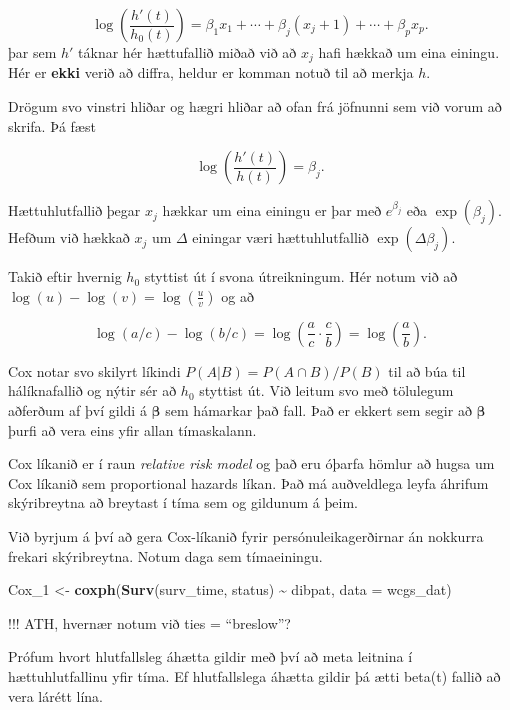 \documentclass[
]{book}
\newenvironment{Shaded}{\begin{snugshade}}{\end{snugshade}}
\newcommand{\DataTypeTok}[1]{\textcolor[rgb]{0.13,0.29,0.53}{#1}}
\newcommand{\DecValTok}[1]{\textcolor[rgb]{0.00,0.00,0.81}{#1}}
\newcommand{\KeywordTok}[1]{\textcolor[rgb]{0.13,0.29,0.53}{\textbf{#1}}}
\newcommand{\NormalTok}[1]{#1}
\newcommand{\OperatorTok}[1]{\textcolor[rgb]{0.81,0.36,0.00}{\textbf{#1}}}
\newcommand{\StringTok}[1]{\textcolor[rgb]{0.31,0.60,0.02}{#1}}
\begin{document}
\[
\log \left( \frac{h'(t)}{h_0(t)} \right) = \beta_1 x_1 + \cdots + \beta_j ( x_j+1) + \cdots + \beta_p x_p.
\]
þar sem \(h'\) táknar hér hættufallið miðað við að \(x_j\) hafi hækkað um eina einingu. Hér er \textbf{ekki} verið að diffra, heldur er komman notuð til að merkja \(h\).

Drögum svo vinstri hliðar og hægri hliðar að ofan frá jöfnunni sem við vorum að skrifa. Þá fæst

\[
\log \left( \frac{h'(t)}{h(t)} \right) = \beta_j.
\]

Hættuhlutfallið þegar \(x_j\) hækkar um eina einingu er þar með \(e^{\beta_j}\) eða \(\exp(\beta_j)\). Hefðum við hækkað \(x_j\) um \(\Delta\) einingar væri hættuhlutfallið \(\exp(\Delta \beta_j)\).

Takið eftir hvernig \(h_0\) styttist út í svona útreikningum. Hér notum við að \(\log(u) - \log(v) = \log(\frac{u}{v})\) og að

\[
\log(a/c) - \log(b/c) = \log \left(\frac{a}{c} \cdot  \frac{c}{b} \right) = \log \left(\frac{a}{b} \right).  
\]

Cox notar svo skilyrt líkindi \(P(A|B) = P(A \cap B) / P(B)\) til að búa til hálíknafallið og nýtir sér að \(h_0\) styttist út. Við leitum svo með tölulegum aðferðum af því gildi á \(\boldsymbol{\beta}\) sem hámarkar það fall. Það er ekkert sem segir að \(\boldsymbol{\beta}\) þurfi að vera eins yfir allan tímaskalann.

Cox líkanið er í raun \emph{relative risk model} og það eru óþarfa hömlur að hugsa um Cox líkanið sem proportional hazards líkan. Það má auðveldlega leyfa áhrifum skýribreytna að breytast í tíma sem og gildunum á þeim.

Við byrjum á því að gera Cox-líkanið fyrir persónuleikagerðirnar án nokkurra frekari skýribreytna. Notum daga sem tímaeiningu.

\begin{Shaded}
\begin{Highlighting}[]
\NormalTok{Cox\_}\DecValTok{1}\NormalTok{ <{-}}\StringTok{ }\KeywordTok{coxph}\NormalTok{(}\KeywordTok{Surv}\NormalTok{(surv\_time, status) }\OperatorTok{\textasciitilde{}}\StringTok{ }\NormalTok{dibpat, }\DataTypeTok{data =}\NormalTok{ wcgs\_dat)}
\end{Highlighting}
\end{Shaded}

!!! ATH, hvernær notum við ties = ``breslow''?

Prófum hvort hlutfallsleg áhætta gildir með því að meta leitnina í hættuhlutfallinu yfir tíma. Ef hlutfallslega áhætta gildir þá ætti beta(t) fallið að vera lárétt lína.
\end{document}
